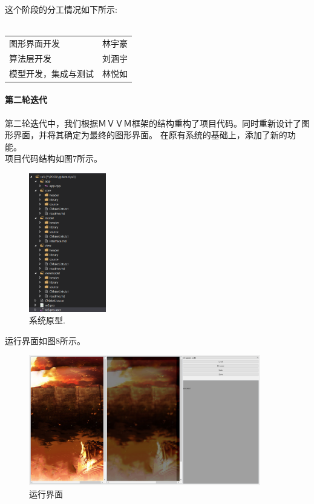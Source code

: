 \documentclass[14pt,a4paper]{article}
\begin{document}
这个阶段的分工情况如下所示:\\\\
\begin{center}
\begin{tabular}{lr}
	图形界面开发  &林宇豪 \\  
	算法层开发　&刘涵宇 \\
	模型开发，集成与测试&林悦如 \\
\end{tabular}
\end{center}

\newpage
\paragraph*{第二轮迭代}
第二轮迭代中，我们根据ＭＶＶＭ框架的结构重构了项目代码。同时重新设计了图形界面，并将其确定为最终的图形界面。 在原有系统的基础上，添加了新的功能。\\ 
项目代码结构如图7所示。 \\
\begin{figure}[h]
\begin{center}
\includegraphics[width=0.3\textwidth]{image/codev2} 
\caption{系统原型.}
\end{center}
\end{figure}

运行界面如图8所示。 \\
\begin{figure}[h]
\begin{center}
\includegraphics[width=0.9\textwidth]{image/second}
\caption{运行界面}
\end{center}
\end{figure}
\end{document}
